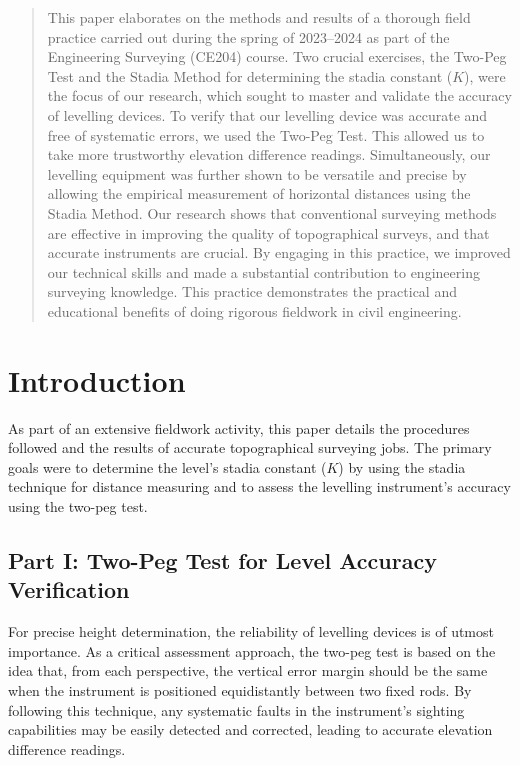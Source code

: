 \documentclass[12pt]{report}
\begin{document}
\newpage
\thispagestyle{fancy}
\pagestyle{fancy}
\begin{abstract}
This paper elaborates on the methods and results of a thorough field practice carried out during the spring of 2023–2024 as part of the Engineering Surveying (CE204) course. Two crucial exercises, the Two-Peg Test and the Stadia Method for determining the stadia constant (\(K\)), were the focus of our research, which sought to master and validate the accuracy of levelling devices. To verify that our levelling device was accurate and free of systematic errors, we used the Two-Peg Test. This allowed us to take more trustworthy elevation difference readings. Simultaneously, our levelling equipment was further shown to be versatile and precise by allowing the empirical measurement of horizontal distances using the Stadia Method. Our research shows that conventional surveying methods are effective in improving the quality of topographical surveys, and that accurate instruments are crucial. By engaging in this practice, we improved our technical skills and made a substantial contribution to engineering surveying knowledge. This practice demonstrates the practical and educational benefits of doing rigorous fieldwork in civil engineering.
\end{abstract}
\tableofcontents
\newpage


\section*{Introduction}

As part of an extensive fieldwork activity, this paper details the procedures followed and the results of accurate topographical surveying jobs. The primary goals were to determine the level's stadia constant (\(K\)) by using the stadia technique for distance measuring and to assess the levelling instrument's accuracy using the two-peg test. 

\subsection*{Part I: Two-Peg Test for Level Accuracy Verification}
For precise height determination, the reliability of levelling devices is of utmost importance. As a critical assessment approach, the two-peg test is based on the idea that, from each perspective, the vertical error margin should be the same when the instrument is positioned equidistantly between two fixed rods. By following this technique, any systematic faults in the instrument's sighting capabilities may be easily detected and corrected, leading to accurate elevation difference readings.
\end{document}
